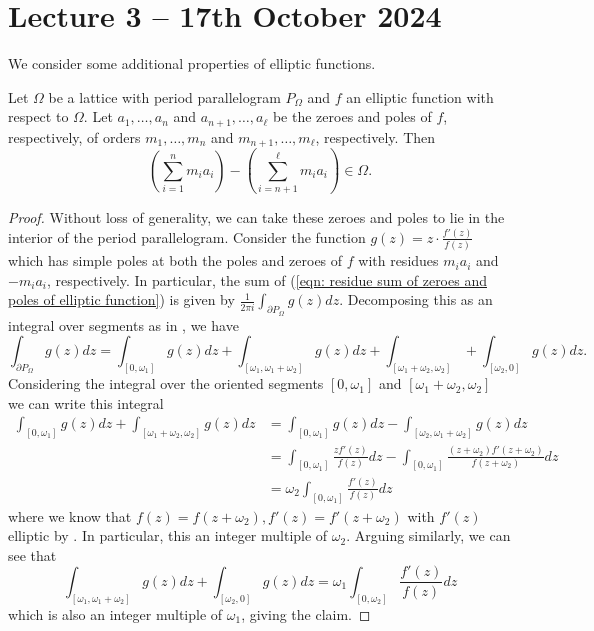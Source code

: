 \section{Lecture 3 -- 17th October 2024}\label{sec: lecture 3}
We consider some additional properties of elliptic functions. 
\begin{proposition}\label{prop: sum of residues of elliptic functions}
    Let $\Omega$ be a lattice with period parallelogram $P_{\Omega}$ and $f$ an elliptic function with respect to $\Omega$. Let $a_{1},\dots,a_{n}$ and $a_{n+1},\dots,a_{\ell}$ be the zeroes and poles of $f$, respectively, of orders $m_{1},\dots,m_{n}$ and $m_{n+1},\dots,m_{\ell}$, respectively. Then 
    \begin{equation}\label{eqn: residue sum of zeroes and poles of elliptic function}
        \left(\sum_{i=1}^{n}m_{i}a_{i}\right)-\left(\sum_{i=n+1}^{\ell}m_{i}a_{i}\right)\in\Omega.
    \end{equation}
\end{proposition}
\begin{proof}
    Without loss of generality, we can take these zeroes and poles to lie in the interior of the period parallelogram. Consider the function $g(z)=z\cdot\frac{f'(z)}{f(z)}$ which has simple poles at both the poles and zeroes of $f$ with residues $m_{i}a_{i}$ and $-m_{i}a_{i}$, respectively. In particular, the sum of (\ref{eqn: residue sum of zeroes and poles of elliptic function}) is given by $\frac{1}{2\pi i}\int_{\partial P_{\Omega}}g(z)dz$. Decomposing this as an integral over segments as in , we have 
    $$\int_{\partial P_{\Omega}}g(z)dz = \int_{[0,\omega_{1}]}g(z)dz + \int_{[\omega_{1},\omega_{1}+\omega_{2}]}g(z)dz + \int_{[\omega_{1}+\omega_{2},\omega_{2}]}+\int_{[\omega_{2},0]}g(z)dz.$$
    Considering the integral over the oriented segments $[0,\omega_{1}]$ and $[\omega_{1}+\omega_{2},\omega_{2}]$ we can write this integral 
    \begin{align*}
        \int_{[0,\omega_{1}]}g(z)dz + \int_{[\omega_{1}+\omega_{2},\omega_{2}]}g(z)dz &= \int_{[0,\omega_{1}]}g(z)dz - \int_{[\omega_{2},\omega_{1}+\omega_{2}]}g(z)dz \\ 
        &= \int_{[0,\omega_{1}]}\frac{zf'(z)}{f(z)}dz - \int_{[0,\omega_{1}]}\frac{(z+\omega_{2})f'(z+\omega_{2})}{f(z+\omega_{2})}dz \\
        &= \omega_{2}\int_{[0,\omega_{1}]}\frac{f'(z)}{f(z)}dz
    \end{align*}
    where we know that $f(z)=f(z+\omega_{2}), f'(z)=f'(z+\omega_{2})$ with $f'(z)$ elliptic by . In particular, this an integer multiple of $\omega_{2}$. Arguing similarly, we can see that 
    $$\int_{[\omega_{1},\omega_{1}+\omega_{2}]}g(z)dz + \int_{[\omega_{2},0]}g(z)dz = \omega_{1}\int_{[0,\omega_{2}]}\frac{f'(z)}{f(z)}dz$$
    which is also an integer multiple of $\omega_{1}$, giving the claim.  
\end{proof}
